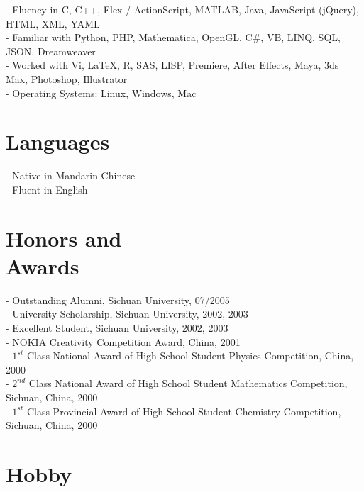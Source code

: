 \documentclass[margin,line]{resume}
\begin{document}
\begin{resume}
      - Fluency in C, C++, Flex / ActionScript, MATLAB, Java, JavaScript (jQuery), HTML, XML, YAML \\
      - Familiar with Python, PHP, Mathematica, OpenGL, C\#, VB, LINQ, SQL, JSON, Dreamweaver \\
      - Worked with Vi, \LaTeX, R, SAS, LISP, Premiere, After Effects, Maya, 3ds Max, Photoshop, Illustrator \\
      - Operating Systems: Linux, Windows, Mac       
      

    \section{\mysidestyle Languages}
      
      - Native in Mandarin Chinese \\
      - Fluent in English 
      

      
    \section{\mysidestyle Honors and \\ Awards} 
      
      - Outstanding Alumni, Sichuan University, 07/2005 \\
      - University Scholarship, Sichuan University, 2002, 2003 \\
      - Excellent Student, Sichuan University, 2002, 2003 \\
      - NOKIA Creativity Competition Award, China, 2001 \\
      - $1^{st}$ Class National Award of High School Student Physics Competition, China, 2000 \\
      - $2^{nd}$ Class National Award of High School Student Mathematics Competition, Sichuan, China, 2000 \\
      - $1^{st}$ Class Provincial Award of High School Student Chemistry Competition, Sichuan, China, 2000       
      

    \section{\mysidestyle Hobby} 
      

\end{resume}
\end{document}
